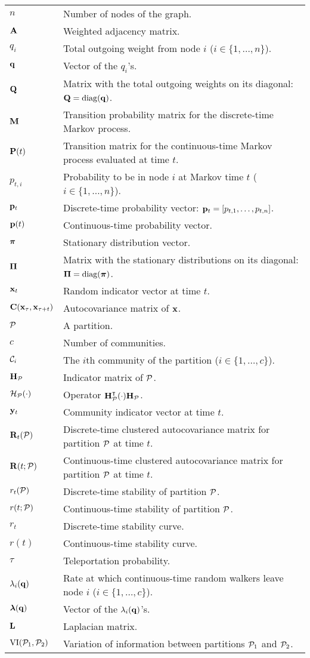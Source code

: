 \begin{tabular}{ll}
	$n$ & Number of nodes of the graph.\\
	$\b A$ & Weighted adjacency matrix.\\
	$q_i$ & Total outgoing weight from node $i$ ($i \in \{1,\dots,n\}$).\\
	$\b q$ & Vector of the $q_i$'s.\\
	$\b Q$ & Matrix with the total outgoing weights on its diagonal: $\b Q = \diag(\b q)$.\\
	$\b M$ & Transition probability matrix for the discrete-time Markov process.\\
	$\b P(t)$ & Transition matrix for the continuous-time Markov process evaluated at time $t$.\\
	$p_{t,i}$ & Probability to be in node $i$ at Markov time $t$ ($i \in \{1,\dots,n\}$).\\
	$\b p_t$ & Discrete-time probability vector: $\b p_t = [p_{t,1},\dots,p_{t,n}]$.\\
	$\b p(t)$ & Continuous-time probability vector.\\
	$\bs \pi$ & Stationary distribution vector.\\
	$\bs \Pi$ & Matrix with the stationary distributions on its diagonal: $\bs \Pi = \diag(\bs \pi)$.\\
	$\b x_t$ & Random indicator vector at time $t$.\\
	$\b C(\b x_\tau,\b x_{\tau+t})$ & Autocovariance matrix of $\b x$.\\
	$\P$ & A partition.\\
	$c$ & Number of communities.\\
	$\C_i$ & The $i$th community of the partition ($i \in \{1,\dots,c\}$).\\
	$\b H_{\P}$ & Indicator matrix of $\P$.\\
	$\mathcal{H}_{\P}(\cdot)$ & Operator $\b H_\P^\t (\cdot) \b H_\P$.\\
	$\b y_t$ & Community indicator vector at time $t$.\\
	$\b R_t(\P)$ & Discrete-time clustered autocovariance matrix for partition $\P$ at time $t$.\\
	$\b R(t;\P)$ & Continuous-time clustered autocovariance matrix for partition $\P$ at time $t$.\\
	$r_t(\P)$ & Discrete-time stability of partition $\P$.\\
	$r(t;\P)$ & Continuous-time stability of partition $\P$.\\
	$r_t$ & Discrete-time stability curve.\\
	$r(t)$ & Continuous-time stability curve.\\
	$\tau$ & Teleportation probability.\\
	$\lambda_i(\b q)$ & Rate at which continuous-time random walkers leave node $i$ ($i \in \{1,\dots,c\}$).\\
	$\bs \lambda(\b q)$ & Vector of the $\lambda_i(\b q)$'s.\\
	$\b L$ & Laplacian matrix.\\
	$\VI(\P_1,\P_2)$ & Variation of information between partitions $\P_1$ and $\P_2$.
\end{tabular}

